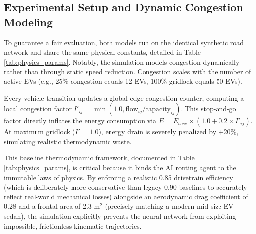 \documentclass[journal, a4paper, twocolumn]{IEEEtran}
\begin{document}
\subsection{Experimental Setup and Dynamic Congestion Modeling}
To guarantee a fair evaluation, both models run on the identical synthetic road network and share the same physical constants, detailed in Table \ref{tab:physics_params}. Notably, the simulation models congestion dynamically rather than through static speed reduction. Congestion scales with the number of active EVs (e.g., 25\% congestion equals 12 EVs, 100\% gridlock equals 50 EVs). 

Every vehicle transition updates a global edge congestion counter, computing a local congestion factor $I'_{ij} = \min(1.0, \text{flow}_{ij} / \text{capacity}_{ij})$. This stop-and-go factor directly inflates the energy consumption via $E = E_{base} \times (1.0 + 0.2 \times I'_{ij})$. At maximum gridlock ($I' = 1.0$), energy drain is severely penalized by +20\%, simulating realistic thermodynamic waste.

\begin{table}[htbp]
\centering
\caption{Parameters Related to Energy Calculation}
\label{tab:physics_params}
\end{table}

This baseline thermodynamic framework, documented in Table \ref{tab:physics_params}, is critical because it binds the AI routing agent to the immutable laws of physics. By enforcing a realistic 0.85 drivetrain efficiency (which is deliberately more conservative than legacy 0.90 baselines to accurately reflect real-world mechanical losses) alongside an aerodynamic drag coefficient of 0.28 and a frontal area of 2.3 m$^2$ (precisely matching a modern mid-size EV sedan), the simulation explicitly prevents the neural network from exploiting impossible, frictionless kinematic trajectories.
\end{document}
